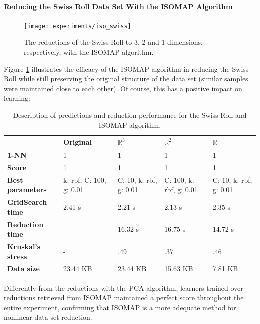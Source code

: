 \paragraph{Reducing the Swiss Roll Data Set With the ISOMAP Algorithm}

\begin{figure}[H]
	\centering
	\captionsetup{justification=centering}
	\texttt{[image: experiments/iso\_swiss]}
	\caption{The reductions of the Swiss Roll to 3, 2 and 1 dimensions, respectively, with the ISOMAP algorithm.}
	\label{fig:dsswissiso}
\end{figure}

Figure \ref{fig:dsswissiso} illustrates the efficacy of the ISOMAP algorithm in reducing the Swiss Roll while still preserving the original structure of the data set (similar samples were maintained close to each other). Of course, this has a positive impact on learning:

\begin{table}[H]
	\centering
	
	\begin{tabular}{|p{.20\linewidth}|p{.15\linewidth}|p{.15\linewidth}|p{.15\linewidth}|p{.15\linewidth}|}
		\hline
		& \textbf{Original} & $\mathbb{R}^3$ & $\mathbb{R}^2$ & $\mathbb{R}$ \\\hline
		\textbf{1-NN} & 1 & 1 & 1 & 1 \\\hline
		\textbf{Score} & 1 & 1 & 1 & 1 \\\hline
		\textbf{Best parameters} & k: rbf, C: 100, g: 0.01 & C: 10, k: rbf, g: 0.01 & C: 100, k: rbf, g: 0.01 & C: 10, k: rbf, g: 0.01 \\\hline
		\textbf{GridSearch time} & 2.41 s & 2.21 s & 2.13 s & 2.35 s \\\hline
		\textbf{Reduction time} & - & 16.32 s & 16.75 s & 14.72 s\\\hline
		\textbf{Kruskal's stress} & - & .49 & .37 & .46 \\\hline
		\textbf{Data size} & 23.44 KB & 23.44 KB & 15.63 KB & 7.81 KB \\\hline
	\end{tabular}
	\captionsetup{justification=centering}
	\caption{Description of predictions and reduction performance for the Swiss Roll and ISOMAP algorithm.}
\end{table}

Differently from the reductions with the PCA algorithm, learners trained over reductions retrieved from ISOMAP maintained a perfect score throughout the entire experiment, confirming that ISOMAP is a more adequate method for nonlinear data set reduction.

